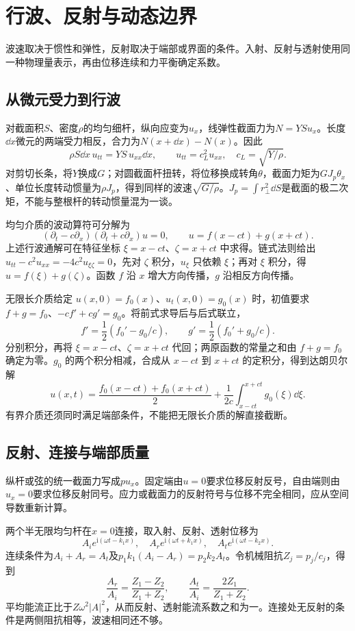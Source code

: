 \section{行波、反射与动态边界}

波速取决于惯性和弹性，反射取决于端部或界面的条件。入射、反射与透射使用同一种物理量表示，再由位移连续和力平衡确定系数。



\subsection{从微元受力到行波}
\label{sec:complete7}
对截面积$S$、密度$\rho$的均匀细杆，纵向应变为$u_x$，线弹性截面力为$N=YSu_x$。长度$\dd x$微元的两端受力相反，合力为$N(x+\dd x)-N(x)$。因此
\[
 \rho S\dd x\,u_{tt}=YS\,u_{xx}\dd x,
 \qquad u_{tt}=c_L^2u_{xx},\quad c_L=\sqrt{Y/\rho}.
\]
对剪切长条，将$Y$换成$G$；对圆截面杆扭转，将位移换成转角$\theta$，截面力矩为$GJ_p\theta_x$、单位长度转动惯量为$\rho J_p$，得到同样的波速$\sqrt{G/\rho}$。$J_p=\int r_\perp^2\dd S$是截面的极二次矩，不能与整根杆的转动惯量混为一谈。

均匀介质的波动算符可分解为
\[
 (\partial_t-c\partial_x)(\partial_t+c\partial_x)u=0,
 \qquad u=f(x-ct)+g(x+ct).
\]
上述行波通解可在特征坐标 $\xi=x-ct$、$\zeta=x+ct$ 中求得。链式法则给出 $u_{tt}-c^2u_{xx}=-4c^2u_{\xi\zeta}=0$，先对 $\zeta$ 积分，$u_\xi$ 只依赖 $\xi$；再对 $\xi$ 积分，得 $u=f(\xi)+g(\zeta)$。函数 $f$ 沿 $x$ 增大方向传播，$g$ 沿相反方向传播。

无限长介质给定 $u(x,0)=f_0(x)$、$u_t(x,0)=g_0(x)$ 时，初值要求 $f+g=f_0$、$-cf'+cg'=g_0$。将前式求导后与后式联立，
\[
f'=\frac12(f_0'-g_0/c),\qquad
g'=\frac12(f_0'+g_0/c).
\]
分别积分，再将 $\xi=x-ct$、$\zeta=x+ct$ 代回；两原函数的常量之和由 $f+g=f_0$ 确定为零。$g_0$ 的两个积分相减，合成从 $x-ct$ 到 $x+ct$ 的定积分，得到达朗贝尔解
\[
 u(x,t)=\frac{f_0(x-ct)+f_0(x+ct)}2
 +\frac1{2c}\int_{x-ct}^{x+ct}g_0(\xi)\dd\xi.
\]
有界介质还须同时满足端部条件，不能把无限长介质的解直接截断。


\subsection{反射、连接与端部质量}
\label{sec:complete7-boundary}
纵杆或弦的统一截面力写成$pu_x$。固定端由$u=0$要求位移反射反号，自由端则由$u_x=0$要求位移反射同号。应力或截面力的反射符号与位移不完全相同，应从空间导数重新计算。

两个半无限均匀杆在$x=0$连接，取入射、反射、透射位移为
\[
 A_i e^{\mathrm i(\omega t-k_1x)},\quad
 A_r e^{\mathrm i(\omega t+k_1x)},\quad
 A_t e^{\mathrm i(\omega t-k_2x)}.
\]
连续条件为$A_i+A_r=A_t$及$p_1k_1(A_i-A_r)=p_2k_2A_t$。令机械阻抗$Z_j=p_j/c_j$，得到
\[
 \frac{A_r}{A_i}=\frac{Z_1-Z_2}{Z_1+Z_2},\qquad
 \frac{A_t}{A_i}=\frac{2Z_1}{Z_1+Z_2}.
\]
平均能流正比于$Z\omega^2|A|^2$，从而反射、透射能流系数之和为一。连接处无反射的条件是两侧阻抗相等，波速相同还不够。

